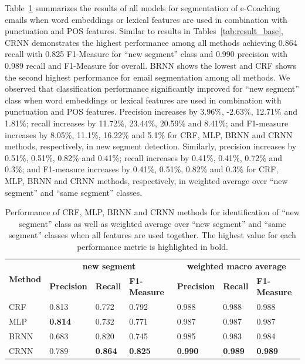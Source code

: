 \documentclass{amia}
\begin{document}
Table~\ref{tab:result_weighted_avg} summarizes the results of all models for segmentation of e-Coaching emails when word embeddings or lexical features are used in combination with punctuation and POS features. Similar to results in Tables~\ref{tab:result_base}, CRNN demonstrates the highest performance among all methods achieving 0.864 recall with 0.825 F1-Measure for ``new segment'' class and 0.990 precision with 0.989 recall and F1-Measure for overall. BRNN shows the lowest and CRF shows the second highest performance for email segmentation among all methods. We observed that classification performance significantly improved for ``new segment'' class when word embeddings or lexical features are used in combination with punctuation and POS features. Precision increases by 3.96\%, -2.63\%, 12.71\% and 1.81\%; recall increases by 11.72\%, 23.44\%, 20.59\% and 8.41\%; and F1-measure increases by 8.05\%, 11.1\%, 16.22\% and 5.1\% for CRF, MLP, BRNN and CRNN methods, respectively, in new segment detection. Similarly, precision increases by 0.51\%, 0.51\%, 0.82\% and 0.41\%; recall increases by 0.41\%, 0.41\%, 0.72\% and 0.3\%; and F1-measure increases by 0.41\%, 0.51\%, 0.82\% and 0.3\% for CRF, MLP, BRNN and CRNN methods, respectively, in weighted average over ``new segment'' and ``same segment'' classes.\\

\begin{table}[ht]
\centering
\caption{Performance of CRF, MLP, BRNN and CRNN methods for identification of ``new segment'' class as well as weighted average over ``new segment'' and ``same segment'' classes when all features are used together. The highest value for each performance metric
is highlighted in bold.}
\label{tab:result_weighted_avg}
 \begin{tabular}{|l|l|l|l|l|l|l|}
  \hline
   \multirow{2}{*}{\textbf{Method}} & \multicolumn{3}{|c|}{\textbf{new segment}} & \multicolumn{3}{|c|}{\textbf{weighted macro average}} \\\cline{2-7}
   & \textbf{Precision}  & \textbf{Recall} & \textbf{F1-Measure} & \textbf{Precision}  & \textbf{Recall} & \textbf{F1-Measure} \\ \hline    
 CRF & 0.813 & 0.772 & 0.792 & 0.988 & 0.988 & 0.988 \\ \hline
 MLP & \textbf{0.814} & 0.732 & 0.771 & 0.987 & 0.987 & 0.987 \\ \hline
 BRNN & 0.683 & 0.820 & 0.745 & 0.985 & 0.983 & 0.984 \\ \hline
 CRNN & 0.789 & \textbf{0.864} & \textbf{0.825} & \textbf{0.990} & \textbf{0.989} & \textbf{0.989} \\ \hline
  \end{tabular}
\end{table}              
\end{document}
